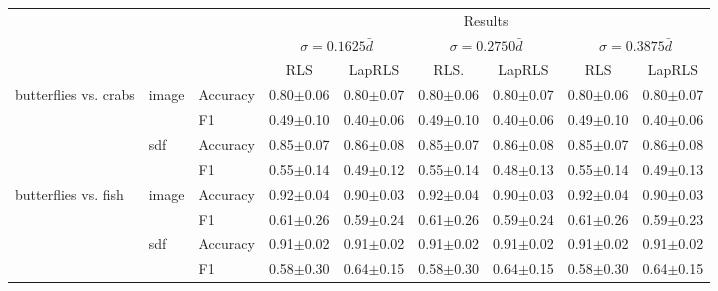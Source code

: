 \documentclass[anon,11pt]{9520} %
\begin{document}
\begin{table}
\scriptsize
\begin{center}
\begin{tabular}{l|l|l|cc|cc|cc|}
& & & \multicolumn{6}{c}{Results} \\ 
  & & & \multicolumn{2}{|c|}{$\sigma=0.1625 \bar{d}$}
       & \multicolumn{2}{|c|}{$\sigma=0.2750 \bar{d}$}
       & \multicolumn{2}{|c|}{$\sigma=0.3875 \bar{d}$}\\ 
& & & RLS & LapRLS & RLS. & LapRLS & RLS & LapRLS\\ \hline 
\multirow{4}{*}{butterflies vs. crabs}
& \multirow{2}{*}{image} & \multirow{1}{*}{Accuracy}& 0.80$\pm$0.06& 0.80$\pm$0.07& 0.80$\pm$0.06& 0.80$\pm$0.07& 0.80$\pm$0.06& 0.80$\pm$0.07\\ 
& & \multirow{1}{*}{F1}& 0.49$\pm$0.10& 0.40$\pm$0.06& 0.49$\pm$0.10& 0.40$\pm$0.06& 0.49$\pm$0.10& 0.40$\pm$0.06\\ \cline{2-9} 

& \multirow{2}{*}{sdf} & \multirow{1}{*}{Accuracy}& 0.85$\pm$0.07& 0.86$\pm$0.08& 0.85$\pm$0.07& 0.86$\pm$0.08& 0.85$\pm$0.07& 0.86$\pm$0.08\\ 
& & \multirow{1}{*}{F1}& 0.55$\pm$0.14& 0.49$\pm$0.12& 0.55$\pm$0.14& 0.48$\pm$0.13& 0.55$\pm$0.14& 0.49$\pm$0.13\\ \cline{2-9} 

\multirow{4}{*}{butterflies vs. fish}
& \multirow{2}{*}{image} & \multirow{1}{*}{Accuracy}& 0.92$\pm$0.04& 0.90$\pm$0.03& 0.92$\pm$0.04& 0.90$\pm$0.03& 0.92$\pm$0.04& 0.90$\pm$0.03\\ 
& & \multirow{1}{*}{F1}& 0.61$\pm$0.26& 0.59$\pm$0.24& 0.61$\pm$0.26& 0.59$\pm$0.24& 0.61$\pm$0.26& 0.59$\pm$0.23\\ \cline{2-9} 

& \multirow{2}{*}{sdf} & \multirow{1}{*}{Accuracy}& 0.91$\pm$0.02& 0.91$\pm$0.02& 0.91$\pm$0.02& 0.91$\pm$0.02& 0.91$\pm$0.02& 0.91$\pm$0.02\\ 
& & \multirow{1}{*}{F1}& 0.58$\pm$0.30& 0.64$\pm$0.15& 0.58$\pm$0.30& 0.64$\pm$0.15& 0.58$\pm$0.30& 0.64$\pm$0.15\\ \cline{2-9} 


\end{tabular}
\end{center}
\end{table}
\end{document}
